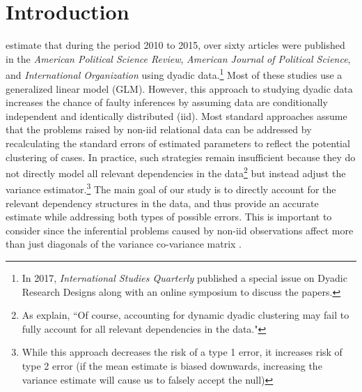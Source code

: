 \section{\textbf{Introduction}}

\citet{aronow:etal:2015} estimate that during the period 2010 to 2015, over sixty articles were published in the \textit{American Political Science Review}, \textit{American Journal of Political Science}, and \textit{International Organization} using dyadic data.\footnote{In 2017, \textit{International Studies Quarterly} published a special issue on Dyadic Research Designs along with an online symposium to discuss the papers.} Most of these studies use a generalized linear model (GLM).  However, this approach to studying dyadic data increases the chance of faulty inferences by assuming data are conditionally independent and identically distributed (iid). Most standard approaches assume that the problems raised by non-iid relational data can be addressed by recalculating the standard errors of estimated parameters to reflect the potential clustering of cases. In practice, such strategies remain insufficient because they do not directly model all relevant dependencies in the data\footnote{As \citet[p.15]{aronow:etal:2015} explain, “Of course, accounting for dynamic dyadic clustering may fail to fully account for all relevant dependencies in the data."} but instead adjust the variance estimator.\footnote{While this approach decreases the risk of a type 1 error, it increases risk of type 2 error (if the mean estimate is biased downwards, increasing the variance estimate will cause us to falsely accept the null)} The main goal of our study is to directly account for the relevant dependency structures in the data, and thus provide an accurate estimate while addressing both types of possible errors. This is important to consider since the inferential problems caused by non-iid  observations affect more than just diagonals of the variance co-variance matrix \citep{beck:2012,franzese:hays:2007,king:roberts:2014}.

